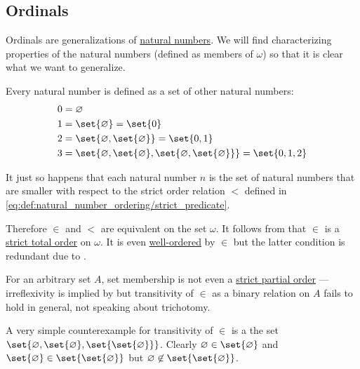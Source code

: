 \subsection{Ordinals}\label{subsec:ordinals}

\begin{remark}\label{rem:ordinal_definition}
  Ordinals are generalizations of \hyperref[def:set_of_natural_numbers]{natural numbers}. We will find characterizing properties of the natural numbers (defined as members of \hyperref[thm:smallest_inductive_set_existence]{\( \omega \)}) so that it is clear what we want to generalize.

  Every natural number is defined as a set of other natural numbers:
  \begin{align*}
    &0 = \varnothing \\
    &1 = \set{ \varnothing } = \set{ 0 } \\
    &2 = \set{ \varnothing, \set{ \varnothing } } = \set{ 0, 1 } \\
    &3 = \set{ \varnothing, \set{ \varnothing }, \set{ \varnothing, \set{ \varnothing } } } = \set{ 0, 1, 2 }
  \end{align*}

  It just so happens that each natural number \( n \) is the set of natural numbers that are smaller with respect to the strict order relation \( < \) defined in \eqref{eq:def:natural_number_ordering/strict_predicate}.

  Therefore \( \in \) and \( < \) are equivalent on the set \( \omega \). It follows from  that \( \in \) is a \hyperref[def:totally_ordered_set]{strict total order} on \( \omega \). It is even \hyperref[def:well_ordered_set]{well-ordered} by \( \in \) but the latter condition is redundant due to .

  For an arbitrary set \( A \), set membership is not even a \hyperref[def:poset/strict]{strict partial order} --- irreflexivity is implied by  but transitivity of \( \in \) as a binary relation on \( A \) fails to hold in general, not speaking about trichotomy.

  A very simple counterexample for transitivity of \( \in \) is a the set \( \set{ \varnothing, \set{ \varnothing }, \set{ \set{ \varnothing } } } \). Clearly \( \varnothing \in \set{ \varnothing } \) and \( \set{ \varnothing } \in \set{ \set{ \varnothing } } \) but \( \varnothing \not\in \set{ \set{ \varnothing } } \).


\end{remark}
